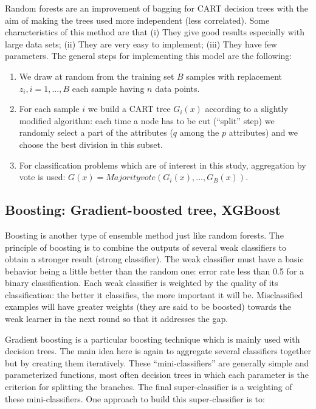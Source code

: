 \documentclass[LaM,binding=0.6cm, english]{sapthesis}
\begin{document}
\par Random forests are an improvement of bagging for CART decision trees with the aim of making the trees used more independent (less correlated). Some characteristics of this method are that (i) They give good results especially  with large data sets; (ii) They are very easy to implement; (iii) They have few parameters.\cite{Fang2016} The general steps for implementing this model are the following:

\begin{enumerate}
	\item We draw at random from the training set \(B\) samples with replacement \(z_i, i = 1, ..., B\) each sample having \(n\) data points.
  	\item For each sample \(i\) we build a CART tree \(G_i(x)\) according to a slightly modified algorithm: each time a node has to be cut (“split” step) we randomly select a part of the attributes (\(q\) among the \(p\) attributes) and we choose the best division in this subset.
  	\item For classification problems which are of interest in this study, aggregation by vote is used: \(G(x) = Majority vote(G_i(x), ..., G_B(x))\).
\end{enumerate}

\subsection{Boosting: Gradient-boosted tree, XGBoost} \label{boosting_model}

Boosting is another type of ensemble method just like random forests. The principle of boosting is to combine the outputs of several weak classifiers to obtain a stronger result (strong classifier). The weak classifier must have a basic behavior being a little better than the random one: error rate less than 0.5 for a binary classification. Each weak classifier is weighted by the quality of its classification: the better it classifies, the more important it will be. Misclassified examples will have greater weights (they are said to be boosted) towards the weak learner in the next round so that it addresses the gap.\cite{Freund}

\par Gradient boosting is a particular boosting technique which is  mainly used with decision trees. The main idea here is again to aggregate several classifiers together but by creating them iteratively. These “mini-classifiers” are generally simple and parameterized functions, most often decision trees in which each parameter is the criterion for splitting the branches. The final super-classifier is a weighting of these mini-classifiers. One approach to build this super-classifier is to:
\end{document}
